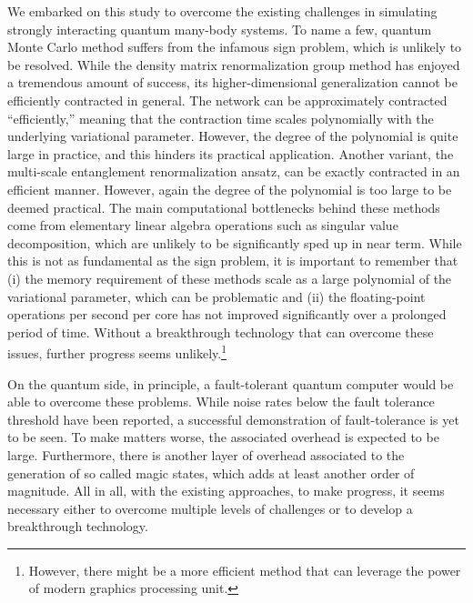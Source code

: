 \documentclass[prx,aps,amsmath,amssymb,floatfix,superscriptaddress,11pt,tightenlines,longbibliography,onecolumn,notitlepage]{revtex4-1}
\begin{document}
We embarked on this study to overcome the existing challenges in simulating strongly interacting quantum many-body systems. To name a few, quantum Monte Carlo method suffers from the infamous sign problem, which is unlikely to be resolved\cite{Troyer2005}. While the density matrix renormalization group method\cite{White1992} has enjoyed a tremendous amount of success, its higher-dimensional generalization\cite{Verstraete2004a} cannot be efficiently contracted in general\cite{Schuch2007}. The network can be approximately contracted ``efficiently,'' meaning that the contraction time scales polynomially with the underlying variational parameter\cite{Lubasch2014}. However, the degree of the polynomial is quite large in practice, and this hinders its practical application. Another variant, the multi-scale entanglement renormalization ansatz\cite{Vidal2008}, can be exactly contracted in an efficient manner. However, again the degree of the polynomial is too large to be deemed practical\cite{Evenbly2009}. The main computational bottlenecks behind these methods come from elementary linear algebra operations such as singular value decomposition, which are unlikely to be significantly sped up in near term. While this is not as fundamental as the sign problem, it is important to remember that (i) the memory requirement of these methods scale as a large polynomial of the variational parameter, which can be problematic and (ii) the floating-point operations per second per core has not improved significantly over a prolonged period of time. Without a breakthrough technology that can overcome these issues, further progress seems unlikely.\footnote{However, there might be a more efficient method that can leverage the power of modern graphics processing unit.}

On the quantum side, in principle, a fault-tolerant quantum computer\cite{Shor1996} would be able to overcome these problems\cite{Lloyd1996}. While noise rates below the fault tolerance threshold have been reported\cite{Benhelm2008,Barends2014}, a successful demonstration of fault-tolerance\cite{Gottesman2016} is yet to be seen. To make matters worse, the associated overhead is expected to be large\cite{Fowler2012}. Furthermore, there is another layer of overhead associated to the generation of so called magic states\cite{Bravyi2005}, which adds at least another order of magnitude. All in all, with the existing approaches, to make progress, it seems necessary either to overcome multiple levels of challenges or to develop a breakthrough technology.
\end{document}
